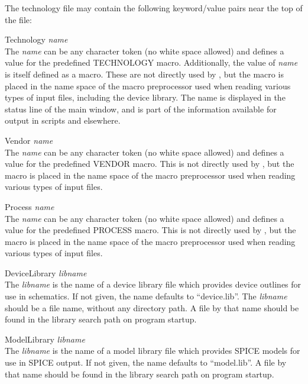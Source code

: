 The technology file may contain the following keyword/value pairs
near the top of the file:
\begin{description}
\item{\vt Technology} {\it name}\\
The {\it name} can be any character token (no white space allowed) and
defines a value for the predefined TECHNOLOGY macro.  Additionally,
the value of {\it name} is itself defined as a macro.  These are not
directly used by {\Xic}, but the macro is placed in the name space of
the macro preprocessor used when reading various types of input files,
including the device library.  The name is displayed in the status
line of the main window, and is part of the information available for
output in scripts and elsewhere.

\item{\vt Vendor} {\it name}\\
The {\it name} can be any character token (no white space allowed) and
defines a value for the predefined VENDOR macro.  This is not
directly used by {\Xic}, but the macro is placed in the name space of
the macro preprocessor used when reading various types of input files.

\item{\vt Process} {\it name}\\
The {\it name} can be any character token (no white space allowed) and
defines a value for the predefined PROCESS macro.  This is not
directly used by {\Xic}, but the macro is placed in the name space of
the macro preprocessor used when reading various types of input files.

\item{\vt DeviceLibrary} {\it libname}\\
The {\it libname} is the name of a device library file which provides
device outlines for use in schematics.  If not given, the name
defaults to ``{\vt device.lib}''.  The {\it libname} should be a file
name, without any directory path.  A file by that name should be found
in the library search path on program startup.

\item{\vt ModelLibrary} {\it libname}\\
The {\it libname} is the name of a model library file which provides
SPICE models for use in SPICE output.  If not given, the name defaults
to ``{\vt model.lib}''.  A file by that name should be found in the
library search path on program startup.


\end{description}

